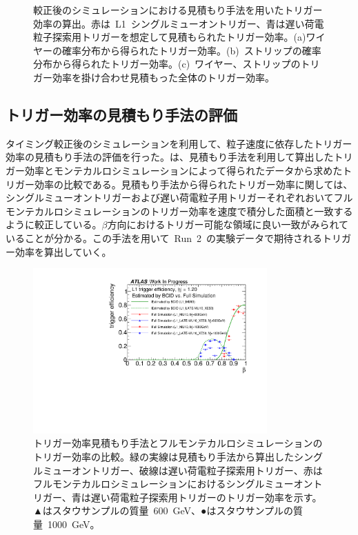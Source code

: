 \begin{figure}[H]
\begin{minipage}{0.99\hsize}
    \subcaption{}
    \end{minipage}
    \caption[較正後のシミュレーションにおける見積もり手法を用いたトリガー効率の算出]{較正後のシミュレーションにおける見積もり手法を用いたトリガー効率の算出。赤は~L1~シングルミューオントリガー、青は遅い荷電粒子探索用トリガーを想定して見積もられたトリガー効率。(a)ワイヤーの確率分布から得られたトリガー効率。(b)~ストリップの確率分布から得られたトリガー効率。(c)~ワイヤー、ストリップのトリガー効率を掛け合わせ見積もった全体のトリガー効率。}\label{fig:efftune}
\end{figure}


\subsection{トリガー効率の見積もり手法の評価}\label{chap:caltri}
タイミング較正後のシミュレーションを利用して、粒子速度に依存したトリガー効率の見積もり手法の評価を行った。は、見積もり手法を利用して算出したトリガー効率とモンテカルロシミュレーションによって得られたデータから求めたトリガー効率の比較である。見積もり手法から得られたトリガー効率に関しては、シングルミューオントリガーおよび遅い荷電粒子用トリガーそれぞれおいてフルモンテカルロシミュレーションのトリガー効率を速度で積分した面積と一致するように較正している。$\beta$方向におけるトリガー可能な領域に良い一致がみられていることが分かる。この手法を用いて~Run~2~の実験データで期待されるトリガー効率を算出していく。

\begin{figure}[H]
    \centering   
    \includegraphics[width=0.8\textwidth,page=1]{img/rec/vs.pdf}
    \caption[トリガー効率見積もり手法とフルモンテカルロシミュレーションのトリガー効率の比較]{トリガー効率見積もり手法とフルモンテカルロシミュレーションのトリガー効率の比較。緑の実線は見積もり手法から算出したシングルミューオントリガー、破線は遅い荷電粒子探索用トリガー、赤はフルモンテカルロシミュレーションにおけるシングルミューオントリガー、青は遅い荷電粒子探索用トリガーのトリガー効率を示す。▲はスタウサンプルの質量~600~GeV、●はスタウサンプルの質量~1000~GeV。}\label{fig:comp}
\end{figure}

